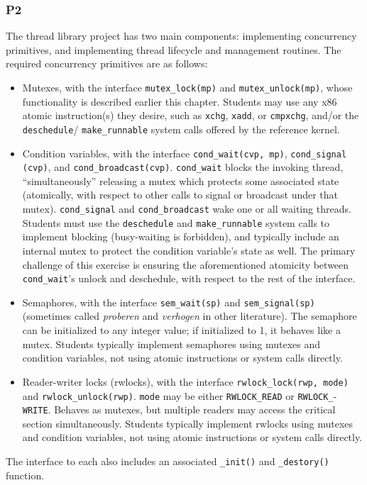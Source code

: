 \subsubsection{P2}
The thread library project \cite{thrlib} has two main components: implementing concurrency primitives, and implementing thread lifecycle and management routines.
The required concurrency primitives are as follows:
\begin{itemize}
	\item Mutexes, with the interface {\tt mutex\_lock(mp)} and {\tt mutex\_unlock(mp)}, whose functionality is described earlier this chapter. Students may use any x86 atomic instruction(s) they desire, such as {\tt xchg}, {\tt xadd}, or {\tt cmpxchg}, and/or the {\tt deschedule}/ {\tt make\_runnable} system calls offered by the reference kernel.
	\item Condition variables, with the interface {\tt cond\_wait(cvp, mp)}, {\tt cond\_signal} {\tt (cvp)}, and {\tt cond\_broadcast(cvp)}. {\tt cond\_wait} blocks the invoking thread, ``simultaneously'' releasing a mutex which protects some associated state (atomically, with respect to other calls to signal or broadcast under that mutex).
		{\tt cond\_signal} and {\tt cond\_broadcast} wake one or all waiting threads.
		Students must use the {\tt deschedule} and {\tt make\_runnable} system calls to implement blocking (busy-waiting is forbidden), and typically include an internal mutex to protect the condition variable's state as well.
		The primary challenge of this exercise is ensuring the aforementioned atomicity between {\tt cond\_wait}'s unlock and deschedule, with respect to the rest of the interface.
	\item Semaphores, with the interface {\tt sem\_wait(sp)} and {\tt sem\_signal(sp)} (sometimes called {\em proberen} and {\em verhogen} in other literature). The semaphore can be initialized to any integer value; if initialized to 1, it behaves like a mutex.
		Students typically implement semaphores using mutexes and condition variables, not using atomic instructions or system calls directly.
	\item Reader-writer locks (rwlocks), with the interface {\tt rwlock\_lock(rwp, mode)} and {\tt rwlock\_unlock(rwp)}. {\tt mode} may be either {\tt RWLOCK\_READ} or {\tt RWLOCK\_}- {\tt WRITE}.
		Behaves as mutexes, but multiple readers may access the critical section simultaneously.
		Students typically implement rwlocks using mutexes and condition variables, not using atomic instructions or system calls directly.
\end{itemize}
The interface to each also includes an associated {\tt \_init()} and {\tt \_destory()} function.

